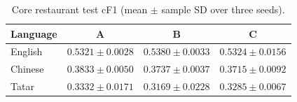 \begin{table}[t]
\centering\small\setlength{\tabcolsep}{3pt}
\caption{Core restaurant test cF1 (mean $\pm$ sample SD over three seeds).}\label{tab:ablation}
\begin{tabular}{lccc}
\toprule
Language & A & B & C \\
\midrule
English & $0.5321\pm0.0028$ & $0.5380\pm0.0033$ & $0.5324\pm0.0156$ \\
Chinese & $0.3833\pm0.0050$ & $0.3737\pm0.0037$ & $0.3715\pm0.0092$ \\
Tatar & $0.3332\pm0.0171$ & $0.3169\pm0.0228$ & $0.3285\pm0.0067$ \\
\bottomrule
\end{tabular}
\end{table}

